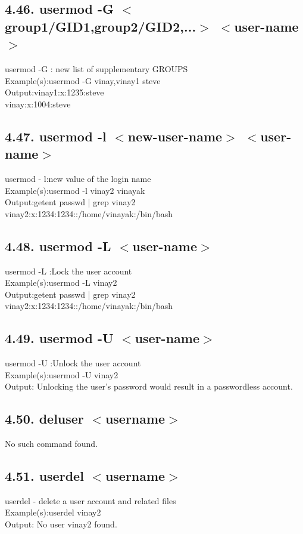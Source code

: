 \documentclass[11pt,a4]{article}
\begin{document}
\begin{enumerate}
\subsection*{4.46. usermod -G $<$group1/GID1,group2/GID2,...$>$ $<$user-name$>$}
usermod -G : new list of supplementary GROUPS\\
Example(s):usermod -G vinay,vinay1 steve
\\
Output:vinay1:x:1235:steve\\vinay:x:1004:steve

\subsection*{4.47. usermod -l $<$new-user-name$>$ $<$user-name$>$}
usermod - l:new value of the login name\\
Example(s):usermod -l vinay2 vinayak
\\
Output:getent passwd | grep  vinay2\\
vinay2:x:1234:1234::/home/vinayak:/bin/bash

\subsection*{4.48. usermod -L $<$user-name$>$}
usermod -L :Lock the user account \\
Example(s):usermod -L vinay2\\
Output:getent passwd | grep  vinay2\\
vinay2:x:1234:1234::/home/vinayak:/bin/bash

\subsection*{4.49. usermod -U $<$user-name$>$}
usermod -U :Unlock the user account \\
Example(s):usermod -U vinay2\\
Output: Unlocking the user's password would result in a passwordless account.

\subsection*{4.50. deluser $<$username$>$}
No such command found.
\subsection*{4.51. userdel $<$username$>$}
userdel - delete a user account and related files\\
Example(s):userdel vinay2\\
Output: No user vinay2 found.


\end{enumerate}
\end{document}
